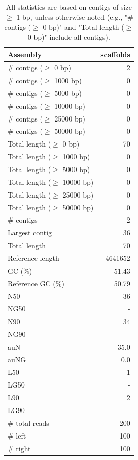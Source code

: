 \documentclass[12pt,a4paper]{article}
\begin{document}
\begin{table}[ht]
\begin{center}
\caption{All statistics are based on contigs of size $\geq$ 1 bp, unless otherwise noted (e.g., "\# contigs ($\geq$ 0 bp)" and "Total length ($\geq$ 0 bp)" include all contigs).}
\begin{tabular}{|l*{1}{|r}|}
\hline
Assembly & scaffolds \\ \hline
\# contigs ($\geq$ 0 bp) & 2 \\ \hline
\# contigs ($\geq$ 1000 bp) & 0 \\ \hline
\# contigs ($\geq$ 5000 bp) & 0 \\ \hline
\# contigs ($\geq$ 10000 bp) & 0 \\ \hline
\# contigs ($\geq$ 25000 bp) & 0 \\ \hline
\# contigs ($\geq$ 50000 bp) & 0 \\ \hline
Total length ($\geq$ 0 bp) & 70 \\ \hline
Total length ($\geq$ 1000 bp) & 0 \\ \hline
Total length ($\geq$ 5000 bp) & 0 \\ \hline
Total length ($\geq$ 10000 bp) & 0 \\ \hline
Total length ($\geq$ 25000 bp) & 0 \\ \hline
Total length ($\geq$ 50000 bp) & 0 \\ \hline
\# contigs & 2 \\ \hline
Largest contig & 36 \\ \hline
Total length & 70 \\ \hline
Reference length & 4641652 \\ \hline
GC (\%) & 51.43 \\ \hline
Reference GC (\%) & 50.79 \\ \hline
N50 & 36 \\ \hline
NG50 & - \\ \hline
N90 & 34 \\ \hline
NG90 & - \\ \hline
auN & 35.0 \\ \hline
auNG & 0.0 \\ \hline
L50 & 1 \\ \hline
LG50 & - \\ \hline
L90 & 2 \\ \hline
LG90 & - \\ \hline
\# total reads & 200 \\ \hline
\# left & 100 \\ \hline
\# right & 100 \\ \hline

\end{tabular}
\end{center}
\end{table}
\end{document}
